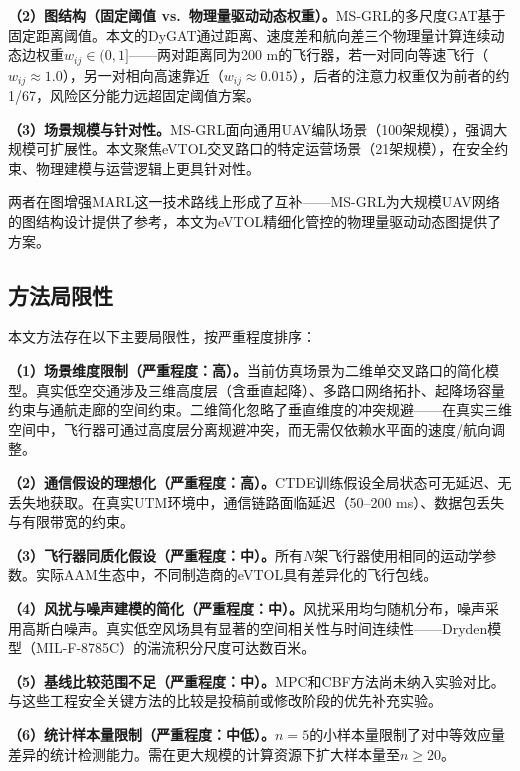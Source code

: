 \documentclass[12pt,a4paper,UTF8]{ctexart}
\begin{document}
\textbf{（2）图结构（固定阈值 vs.\ 物理量驱动动态权重）。}MS-GRL的多尺度GAT基于固定距离阈值。本文的DyGAT通过距离、速度差和航向差三个物理量计算连续动态边权重$w_{ij} \in (0, 1]$——两对距离同为200 m的飞行器，若一对同向等速飞行（$w_{ij} \approx 1.0$），另一对相向高速靠近（$w_{ij} \approx 0.015$），后者的注意力权重仅为前者的约1/67，风险区分能力远超固定阈值方案。

\textbf{（3）场景规模与针对性。}MS-GRL面向通用UAV编队场景（100架规模），强调大规模可扩展性。本文聚焦eVTOL交叉路口的特定运营场景（21架规模），在安全约束、物理建模与运营逻辑上更具针对性。

两者在图增强MARL这一技术路线上形成了互补——MS-GRL为大规模UAV网络的图结构设计提供了参考，本文为eVTOL精细化管控的物理量驱动动态图提供了方案。

\subsection{方法局限性}

本文方法存在以下主要局限性，按严重程度排序：

\textbf{（1）场景维度限制（严重程度：高）。}当前仿真场景为二维单交叉路口的简化模型。真实低空交通涉及三维高度层（含垂直起降）、多路口网络拓扑、起降场容量约束与通航走廊的空间约束。二维简化忽略了垂直维度的冲突规避——在真实三维空间中，飞行器可通过高度层分离规避冲突，而无需仅依赖水平面的速度/航向调整。

\textbf{（2）通信假设的理想化（严重程度：高）。}CTDE训练假设全局状态可无延迟、无丢失地获取。在真实UTM环境中，通信链路面临延迟（50--200 ms）、数据包丢失与有限带宽的约束。

\textbf{（3）飞行器同质化假设（严重程度：中）。}所有$N$架飞行器使用相同的运动学参数。实际AAM生态中，不同制造商的eVTOL具有差异化的飞行包线。

\textbf{（4）风扰与噪声建模的简化（严重程度：中）。}风扰采用均匀随机分布，噪声采用高斯白噪声。真实低空风场具有显著的空间相关性与时间连续性——Dryden模型（MIL-F-8785C）\cite{ref20}的湍流积分尺度可达数百米。

\textbf{（5）基线比较范围不足（严重程度：中）。}MPC和CBF方法尚未纳入实验对比。与这些工程安全关键方法的比较是投稿前或修改阶段的优先补充实验。

\textbf{（6）统计样本量限制（严重程度：中低）。}$n=5$的小样本量限制了对中等效应量差异的统计检测能力。需在更大规模的计算资源下扩大样本量至$n \geq 20$。

\end{document}
